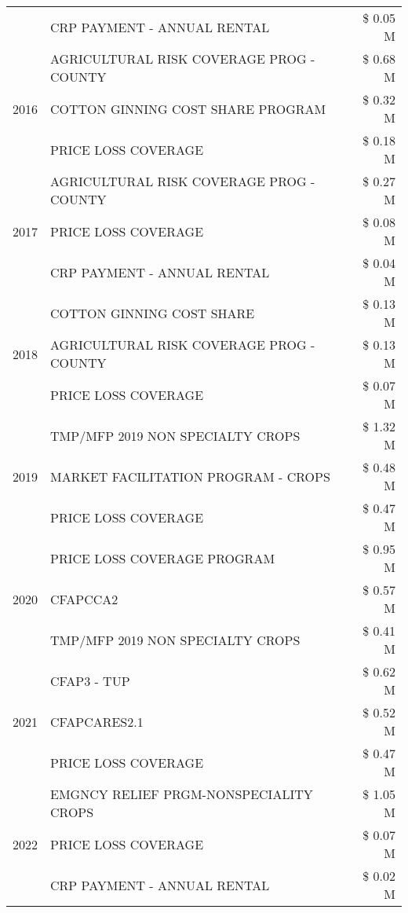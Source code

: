 \begin{tabular}{llr}
 & CRP PAYMENT - ANNUAL RENTAL & \$ 0.05 M \\
\cline{1-3}
\multirow[t]{3}{*}{2016} & AGRICULTURAL RISK COVERAGE PROG - COUNTY & \$ 0.68 M \\
 & COTTON GINNING COST SHARE PROGRAM & \$ 0.32 M \\
 & PRICE LOSS COVERAGE & \$ 0.18 M \\
\cline{1-3}
\multirow[t]{3}{*}{2017} & AGRICULTURAL RISK COVERAGE PROG - COUNTY & \$ 0.27 M \\
 & PRICE LOSS COVERAGE & \$ 0.08 M \\
 & CRP PAYMENT - ANNUAL RENTAL & \$ 0.04 M \\
\cline{1-3}
\multirow[t]{3}{*}{2018} & COTTON GINNING COST SHARE & \$ 0.13 M \\
 & AGRICULTURAL RISK COVERAGE PROG - COUNTY & \$ 0.13 M \\
 & PRICE LOSS COVERAGE & \$ 0.07 M \\
\cline{1-3}
\multirow[t]{3}{*}{2019} & TMP/MFP 2019 NON SPECIALTY CROPS & \$ 1.32 M \\
 & MARKET FACILITATION PROGRAM - CROPS & \$ 0.48 M \\
 & PRICE LOSS COVERAGE & \$ 0.47 M \\
\cline{1-3}
\multirow[t]{3}{*}{2020} & PRICE LOSS COVERAGE PROGRAM & \$ 0.95 M \\
 & CFAPCCA2 & \$ 0.57 M \\
 & TMP/MFP 2019 NON SPECIALTY CROPS & \$ 0.41 M \\
\cline{1-3}
\multirow[t]{3}{*}{2021} & CFAP3 - TUP & \$ 0.62 M \\
 & CFAPCARES2.1 & \$ 0.52 M \\
 & PRICE LOSS COVERAGE & \$ 0.47 M \\
\cline{1-3}
\multirow[t]{3}{*}{2022} & EMGNCY RELIEF PRGM-NONSPECIALITY CROPS & \$ 1.05 M \\
 & PRICE LOSS COVERAGE & \$ 0.07 M \\
 & CRP PAYMENT - ANNUAL RENTAL & \$ 0.02 M \\
\cline{1-3}
\bottomrule
\end{tabular}
